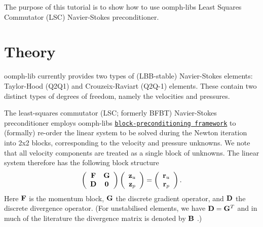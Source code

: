 The purpose of this tutorial is to show how to use {\ttfamily oomph-\/lib\textquotesingle{}s} Least Squares Commutator (L\+SC) Navier-\/\+Stokes preconditioner.



 

\hypertarget{index_theory}{}\section{Theory}\label{index_theory}
{\ttfamily oomph-\/lib} currently provides two types of (L\+B\+B-\/stable) Navier-\/\+Stokes elements\+: Taylor-\/\+Hood (Q2\+Q1) and Crouzeix-\/\+Raviart (Q2\+Q-\/1) elements. These contain two distinct types of degrees of freedom, namely the velocities and pressures.

The least-\/squares commutator (L\+SC; formerly B\+F\+BT) Navier-\/\+Stokes preconditioner employs {\ttfamily oomph-\/lib\textquotesingle{}s} \href{../../../mpi/block_preconditioners/html/index.html}{\tt block-\/preconditioning framework} to (formally) re-\/order the linear system to be solved during the Newton iteration into 2x2 blocks, corresponding to the velocity and pressure unknowns. We note that all velocity components are treated as a single block of unknowns. The linear system therefore has the following block structure \[ \left( \begin{array}{cc} {\bf F} & {\bf G} \\ {\bf D} & {\bf 0} \end{array} \right) \left( \begin{array}{c} {\bf z}_u \\ {\bf z}_p \end{array} \right) = \left( \begin{array}{c} {\bf r}_u \\ {\bf r}_p \end{array} \right). \] Here $ {\bf F}$ is the momentum block, $ {\bf G} $ the discrete gradient operator, and $ {\bf D}$ the discrete divergence operator. (For unstabilised elements, we have $ {\bf D} = {\bf G}^T $ and in much of the literature the divergence matrix is denoted by $ {\bf B} $ .)

